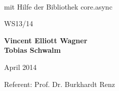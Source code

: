 \thispagestyle{empty}

\begin{center}


{\Huge \thetitle}\\

\vspace{20mm}
\begin{huge}
mit Hilfe der Bibliothek core.async
\end{huge}
\vspace{15mm}

\begin{Large}
WS13/14
\end{Large}

\vspace{15mm}
\begin{Large}
\textbf{Vincent Elliott Wagner}\\
\textbf{Tobias Schwalm}\\
\end{Large}
\vspace{15mm}
\begin{large}
April 2014
\end{large}

\vspace{15mm}
\begin{large}
Referent: Prof. Dr. Burkhardt Renz\\
\end{large}

\end{center}